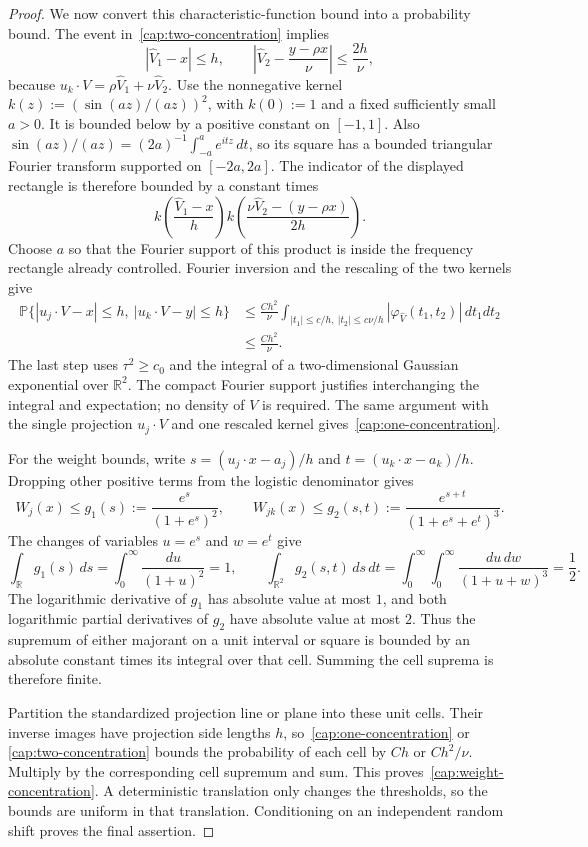 \documentclass[11pt,letterpaper]{article}
\theoremstyle{remark}
\newcommand{\Pp}{\mathbb P}
\newcommand{\R}{\mathbb R}
\begin{document}
\begin{proof}
We now convert this characteristic-function bound into a
probability bound. The event in~\eqref{cap:two-concentration}
implies
\[
 |\widehat V_1-x|\le h,\qquad
 \left|\widehat V_2-\frac{y-\rho x}{\nu}\right|
 \le\frac{2h}{\nu},
\]
because $u_k\cdot V=\rho\widehat V_1+\nu\widehat V_2$.
Use the nonnegative kernel
$k(z):=(\sin(az)/(az))^2$, with $k(0):=1$ and a fixed
sufficiently small $a>0$. It is bounded below by a positive
constant on $[-1,1]$. Also
$\sin(az)/(az)=(2a)^{-1}\int_{-a}^a e^{itz}\,dt$,
so its square has a bounded triangular Fourier transform
supported on $[-2a,2a]$.
The indicator of the displayed rectangle is therefore bounded
by a constant times
\[
 k\left(\frac{\widehat V_1-x}{h}\right)
 k\left(\frac{\nu\widehat V_2-(y-\rho x)}{2h}\right).
\]
Choose $a$ so that the Fourier support of this product is
inside the frequency rectangle already controlled. Fourier
inversion and the rescaling of the two kernels give
\[
 \begin{split}
 \Pp\{|u_j\cdot V-x|\le h,\ |u_k\cdot V-y|\le h\}
 &\le\frac{Ch^2}{\nu}
   \int_{|t_1|\le c/h,\ |t_2|\le c\nu/h}
       |\varphi_{\widehat V}(t_1,t_2)|\,dt_1dt_2\\
 &\le\frac{Ch^2}{\nu}.
 \end{split}
\]
The last step uses $\tau^2\ge c_0$ and the integral of a
two-dimensional Gaussian exponential over $\R^2$.
The compact Fourier support justifies interchanging the integral
and expectation; no density of $V$ is required. The same argument
with the single projection $u_j\cdot V$ and one rescaled kernel
gives~\eqref{cap:one-concentration}.

For the weight bounds, write
$s=(u_j\cdot x-a_j)/h$ and $t=(u_k\cdot x-a_k)/h$.
Dropping other positive terms from the logistic denominator gives
\[
 W_j(x)\le g_1(s):=\frac{e^s}{(1+e^s)^2},\qquad
 W_{jk}(x)\le g_2(s,t):=
                 \frac{e^{s+t}}{(1+e^s+e^t)^3}.
\]
The changes of variables $u=e^s$ and $w=e^t$ give
\[
 \int_{\R}g_1(s)\,ds=\int_0^\infty\frac{du}{(1+u)^2}=1,
 \qquad
 \int_{\R^2}g_2(s,t)\,ds\,dt
 =\int_0^\infty\int_0^\infty\frac{du\,dw}{(1+u+w)^3}
 =\frac12.
\]
The logarithmic derivative of $g_1$ has absolute value at most
$1$, and both logarithmic partial derivatives of $g_2$ have
absolute value at most $2$. Thus the supremum of either
majorant on a unit interval or square is bounded by an absolute
constant times its integral over that cell. Summing the cell
suprema is therefore finite.

Partition the standardized projection line or plane into these
unit cells. Their inverse images have projection side lengths
$h$, so~\eqref{cap:one-concentration} or
\eqref{cap:two-concentration} bounds the probability of each cell
by $Ch$ or $Ch^2/\nu$. Multiply by the corresponding cell
supremum and sum. This proves~\eqref{cap:weight-concentration}.
A deterministic translation only changes the thresholds, so the
bounds are uniform in that translation. Conditioning on an
independent random shift proves the final assertion.
\end{proof}
\end{document}
